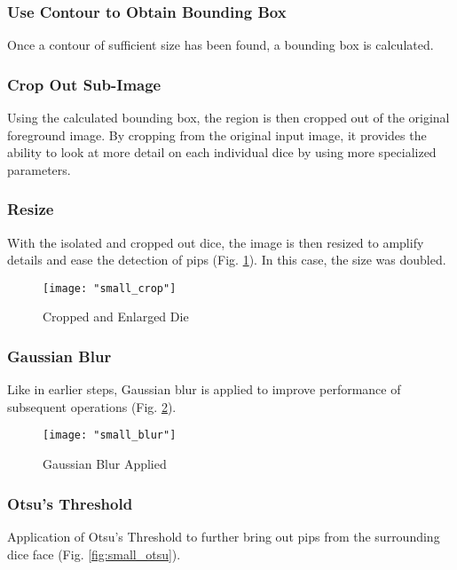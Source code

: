 \documentclass[journal]{IEEEtran}
\begin{document}
\subsubsection{Use Contour to Obtain Bounding Box}
Once a contour of sufficient size has been found, a bounding box is calculated.\\

\subsubsection{Crop Out Sub-Image}
Using the calculated bounding box, the region is then cropped out of the original foreground image. By cropping from the original input image, it provides the ability to look at more detail on each individual dice by using more specialized parameters.\\

\subsubsection{Resize}
With the isolated and cropped out dice, the image is then resized to amplify details and ease the detection of pips (Fig. \ref{fig:small_crop}). In this case, the size was doubled.\\

\begin{figure}[h]
	\texttt{[image: "small\_crop"]}
	\centering
	\caption{Cropped and Enlarged Die}
	\label{fig:small_crop}
\end{figure}

\subsubsection{Gaussian Blur}
Like in earlier steps, Gaussian blur is applied to improve performance of subsequent operations (Fig. \ref{fig:small_blur}).\\

\begin{figure}[h]
	\texttt{[image: "small\_blur"]}
	\centering
	\caption{Gaussian Blur Applied}
	\label{fig:small_blur}
\end{figure}

\subsubsection{Otsu's Threshold}
Application of Otsu's Threshold to further bring out pips from the surrounding dice face (Fig. \ref{fig:small_otsu}).\\
\end{document}
